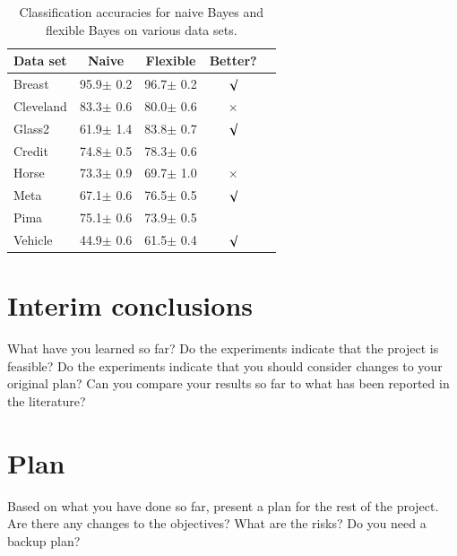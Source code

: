 \documentclass{article}
\begin{document}
\begin{table}[tb]
\vskip 3mm
\begin{center}
\begin{small}
\begin{sc}
\begin{tabular}{lcccr}
\hline
\abovespace\belowspace
Data set & Naive & Flexible & Better? \\
\hline
\abovespace
Breast    & 95.9$\pm$ 0.2& 96.7$\pm$ 0.2& $\surd$ \\
Cleveland & 83.3$\pm$ 0.6& 80.0$\pm$ 0.6& $\times$\\
Glass2    & 61.9$\pm$ 1.4& 83.8$\pm$ 0.7& $\surd$ \\
Credit    & 74.8$\pm$ 0.5& 78.3$\pm$ 0.6&         \\
Horse     & 73.3$\pm$ 0.9& 69.7$\pm$ 1.0& $\times$\\
Meta      & 67.1$\pm$ 0.6& 76.5$\pm$ 0.5& $\surd$ \\
Pima      & 75.1$\pm$ 0.6& 73.9$\pm$ 0.5&         \\
\belowspace
Vehicle   & 44.9$\pm$ 0.6& 61.5$\pm$ 0.4& $\surd$ \\
\hline
\end{tabular}
\end{sc}
\end{small}
\caption{Classification accuracies for naive Bayes and flexible 
Bayes on various data sets.}
\label{tab:sample-table}
\end{center}
\vskip -3mm
\end{table}





\section{Interim conclusions}
\label{sec:concl}
What have you learned so far?  Do the experiments indicate that the project is feasible?  Do the experiments indicate that you should consider changes to your original plan?  Can you compare your results so far to what has been reported in the literature?

\section{Plan}
\label{sec:plan}
Based on what you have done so far, present a plan for the rest of the project.  Are there any changes to the objectives?  What are the risks?  Do you need a backup plan?


\end{document}
